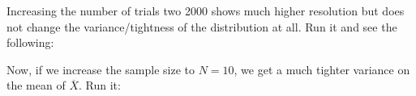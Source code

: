 \begin{fullwidth}
\step Increasing the number of trials two 2000 shows much higher resolution but does not change the variance/tightness of the distribution at all. Run it and see the following:


\step Now, if we increase the sample size to $N=10$, we get a much tighter variance on the mean of $\overline{X}$. Run it:



\end{fullwidth}
